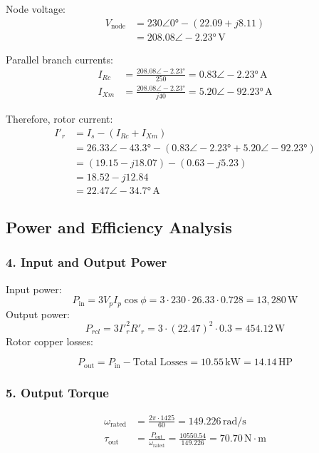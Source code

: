 \documentclass[a4paper,12pt]{article}
\begin{document}
Node voltage:
\begin{align}
    V_{\text{node}} &= 230\angle 0° - (22.09 + j8.11) \\
    &= 208.08\angle -2.23°\,\text{V}
\end{align}

Parallel branch currents:
\begin{align}
    I_{Rc} &= \frac{208.08\angle -2.23°}{250} = 0.83\angle -2.23°\,\text{A} \\
    I_{Xm} &= \frac{208.08\angle -2.23°}{j40} = 5.20\angle -92.23°\,\text{A}
\end{align}

Therefore, rotor current:
\begin{align}
    I'_r &= I_s - (I_{Rc} + I_{Xm}) \\
    &= 26.33\angle -43.3° - (0.83\angle -2.23° + 5.20\angle -92.23°) \\
    &= (19.15 - j18.07) - (0.63 - j5.23) \\
    &= 18.52 - j12.84 \\
    &= 22.47\angle -34.7°\,\text{A}
\end{align}

\subsection{Power and Efficiency Analysis}

\subsubsection{4. Input and Output Power}
Input power:
\begin{equation}
    P_{\text{in}} = 3V_pI_p\cos\phi = 3 \cdot 230 \cdot 26.33 \cdot 0.728 = 13,280\,\text{W}
\end{equation}
Output power:
\begin{equation}
    P_{rcl} = 3I'^2_rR'_r = 3 \cdot (22.47)^2 \cdot 0.3 = 454.12\,\text{W}
\end{equation}
Rotor copper losses:

\begin{equation}
    P_{\text{out}} = P_{\text{in}} - \text{Total Losses} = 10.55\,\text{kW} = 14.14\,\text{HP}
\end{equation}

\subsubsection{5. Output Torque}
\begin{align}
    \omega_{\text{rated}} &= \frac{2\pi \cdot 1425}{60} = 149.226\,\text{rad/s} \\
    \tau_{\text{out}} &= \frac{P_{\text{out}}}{\omega_{\text{rated}}} = \frac{10550.54}{149.226} = 70.70\,\text{N}\cdot\text{m}
\end{align}
\end{document}
